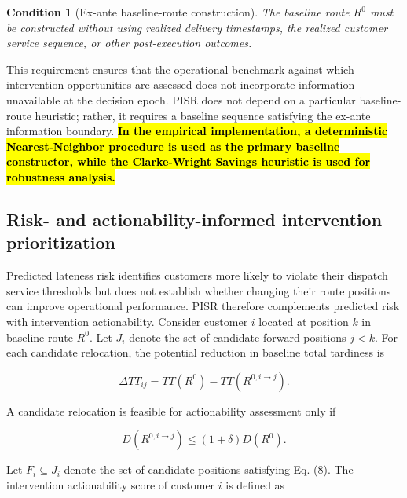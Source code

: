 \documentclass[11pt,a4paper]{article}
\newtheorem{condition}{Condition}
\begin{document}
\begin{condition}[Ex-ante baseline-route construction]
The baseline route \(R^{0}\) must be constructed without using realized delivery timestamps, the realized customer service sequence, or other post-execution outcomes.
\end{condition}

This requirement ensures that the operational benchmark against which
intervention opportunities are assessed does not incorporate information
unavailable at the decision epoch. PISR does not depend on a particular
baseline-route heuristic; rather, it requires a baseline sequence
satisfying the ex-ante information boundary. \textbf{\hl{In the
empirical implementation, a deterministic Nearest-Neighbor procedure is
used as the primary baseline constructor, while the Clarke-Wright
Savings heuristic is used for robustness analysis.}}\cite{clarke1964}

\subsection{Risk- and actionability-informed intervention prioritization}\label{sec:prioritization}

Predicted lateness risk identifies customers more likely to violate
their dispatch service thresholds but does not establish whether changing
their route positions can improve operational performance. PISR
therefore complements predicted risk with intervention actionability.
Consider customer \(i\) located at position \(k\) in baseline route
\(R^{0}\). Let \(J_{i}\) denote the set of candidate forward positions
\(j < k\). For each candidate relocation, the potential reduction in
baseline total tardiness is

\begin{equation}
\Delta TT_{ij} = TT\left( R^{0} \right) - TT\left( R^{0,i \rightarrow j} \right).
\label{eq:7}
\end{equation}

A candidate relocation is feasible for actionability assessment only if

\begin{equation}
D\left( R^{0,i \rightarrow j} \right) \leq (1 + \delta)D\left( R^{0} \right).
\label{eq:8}
\end{equation}

Let \(F_{i} \subseteq J_{i}\) denote the set of candidate positions
satisfying Eq. (8). The intervention actionability score of customer
\(i\) is defined as
\end{document}
